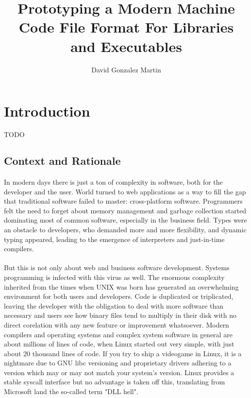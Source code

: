 \documentclass[12pt]{article}
\title{\vspace{-2.5cm}\textbf{Prototyping a Modern Machine Code File Format For Libraries and Executables}}
\author{David Gonzalez Martin}
\date{\vspace{-5ex}}
\begin{document}
	\maketitle{\vspace{-1.5cm}}
	\newpage
	\tableofcontents
	\newpage
	\section{Introduction}
    TODO
	\subsection{Context and Rationale}
	\paragraph{}In modern days there is just a ton of complexity in software, both for the developer and the user. World turned to web applications as a way to fill the gap that traditional software failed to master: cross-platform software. Programmers felt the need to forget about memory management and garbage collection started dominating most of common software, especially in the business field. Types were an obstacle to developers, who demanded more and more flexibility, and dynamic typing appeared, leading to the emergence of interpreters and just-in-time compilers.
	\paragraph{}But this is not only about web and business software development. Systems programming is infected with this virus as well. The enormous complexity inherited from the times when UNIX was born has generated an overwhelming environment for both users and developers. Code is duplicated or triplicated, leaving the developer with the obligation to deal with more software than necessary and users see how binary files tend to multiply in their disk with no direct corelation with any new feature or improvement whatsoever. Modern compilers and operating systems and complex system software in general are about millions of lines of code, when Linux started out very simple, with just about 20 thousand lines of code. If you try to ship a videogame in Linux, it is a nightmare due to GNU libc versioning and proprietary drivers adhering to a version which may or may not match your system's version. Linux provides a stable syscall interface but no advantage is taken off this, translating from Microsoft land the so-called term "DLL hell".
\end{document}
